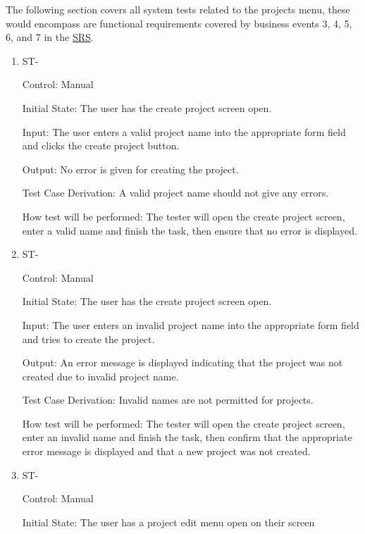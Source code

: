 \documentclass[12pt, titlepage]{article}
\newcounter{TESTID}
\newcommand\TESTNUM{\stepcounter{TESTID}\theTESTID}
\begin{document}
	The following section covers all system tests related to the projects menu, these would encompass are functional requirements covered by business events 3, 4, 5, 6, and 7 in the \href{https://github.com/RutheniumVI/UnderTree/blob/main/docs/SRS/SRS.pdf}{SRS}.
	
	\begin{enumerate}
		
		\item{ST-\TESTNUM\\}
		
		Control: Manual
		
		Initial State: The user has the create project screen open.
		
		Input: The user enters a valid project name into the appropriate form field and clicks the create project button.
		
		Output: No error is given for creating the project. 
		
		Test Case Derivation: A valid project name should not give any errors.
		
		How test will be performed: The tester will open the create project screen, enter a valid name and finish the task, then ensure that no error is displayed.
		
		\item{ST-\TESTNUM\\}
		
		Control: Manual
		
		Initial State: The user has the create project screen open.
		
		Input: The user enters an invalid project name into the appropriate form field and tries to create the project.
		
		Output: An error message is displayed indicating that the project was not created due to invalid project name. 
		
		Test Case Derivation: Invalid names are not permitted for projects.
		
		How test will be performed: The tester will open the create project screen, enter an invalid name and finish the task, then confirm that the appropriate error message is displayed and that a new project was not created.
		
		\item{ST-\TESTNUM\\}
		
		Control: Manual
		
		Initial State: The user has a project edit menu open on their screen
		

\end{enumerate}
\end{document}
